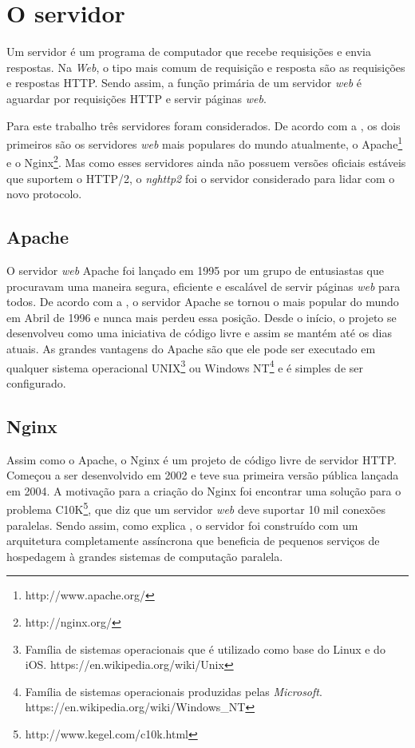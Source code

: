 \section{O servidor}
\label{oservidor}

Um servidor é um programa de computador que recebe requisições e envia respostas. Na \textit{Web}, o tipo mais comum de requisição e resposta são as requisições e respostas HTTP. Sendo assim, a função primária de um servidor \textit{web} é aguardar por requisições HTTP e servir páginas \textit{web}.

Para este trabalho três servidores foram considerados. De acordo com a , os dois primeiros são os servidores \textit{web} mais populares do mundo atualmente, o Apache\footnote{http://www.apache.org/} e o Nginx\footnote{http://nginx.org/}. Mas como esses servidores ainda não possuem versões oficiais estáveis que suportem o HTTP/2, o \textit{nghttp2} foi o servidor considerado para lidar com o novo protocolo.

\subsection{Apache}
\label{apache}

O servidor \textit{web} Apache foi lançado em 1995 por um grupo de entusiastas que procuravam uma maneira segura, eficiente e escalável de servir páginas \textit{web} para todos.  De acordo com a , o servidor Apache se tornou o mais popular do mundo em Abril de 1996 e nunca mais perdeu essa posição. Desde o início, o projeto se desenvolveu como uma iniciativa de código livre e assim se mantém até os dias atuais. As grandes vantagens do Apache são que ele pode ser executado em qualquer sistema operacional UNIX\footnote{Família de sistemas operacionais que é utilizado como base do Linux e do iOS. https://en.wikipedia.org/wiki/Unix} ou Windows NT\footnote{Família de sistemas operacionais produzidas pelas \textit{Microsoft}. https://en.wikipedia.org/wiki/Windows\_NT} e é simples de ser configurado.

\subsection{Nginx}
\label{nginx}

Assim como o Apache, o Nginx é um projeto de código livre de servidor HTTP. Começou a ser desenvolvido em 2002 e teve sua primeira versão pública lançada em 2004. A motivação para a criação do Nginx foi encontrar uma solução para o problema C10K\footnote{http://www.kegel.com/c10k.html}, que diz que um servidor \textit{web} deve suportar 10 mil conexões paralelas. Sendo assim, como explica , o servidor foi construído com um arquitetura completamente assíncrona que beneficia de pequenos serviços de hospedagem à grandes sistemas de computação paralela.


